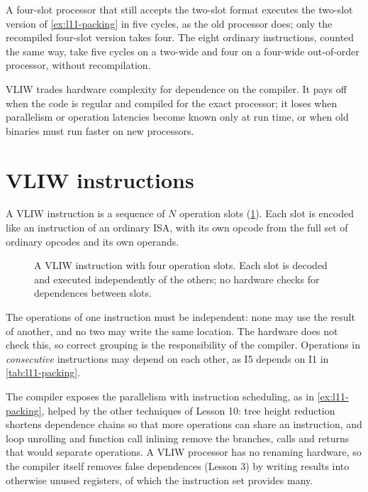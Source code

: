 \documentclass[../main.tex]{subfiles}
\begin{document}
\begin{example}
  \label{ex:l11-compat}
  A four-slot processor that still accepts the two-slot format executes the
  two-slot version of \cref{ex:l11-packing} in five cycles, as the old
  processor does; only the recompiled four-slot version takes four.  The eight
  ordinary instructions, counted the same way, take five cycles on a two-wide
  and four on a four-wide out-of-order processor, without recompilation.
\end{example}

\begin{keypoint}
  VLIW trades hardware complexity for dependence on the compiler.  It pays off
  when the code is regular and compiled for the exact processor; it loses when
  parallelism or operation latencies become known only at run time, or when
  old binaries must run faster on new processors.
\end{keypoint}

\section{VLIW instructions}
\label{sec:l11-instructions}

A VLIW instruction is a sequence of $N$ operation slots
(\cref{fig:l11-format}).  Each
slot is encoded like an instruction of an ordinary ISA, with its own opcode
from the full set of ordinary opcodes and its own operands.

\begin{figure}[htbp]
  \centering
  
  \caption{A VLIW instruction with four operation slots.  Each slot is decoded
    and executed independently of the others; no hardware checks for
    dependences between slots.}
  \label{fig:l11-format}
\end{figure}

The operations of one instruction must be independent: none may use the
result of another, and no two may write the same location.  The hardware does
not check this, so correct grouping is the responsibility of the compiler.
Operations in \emph{consecutive} instructions may depend on each other, as I5
depends on I1 in \cref{tab:l11-packing}.

The compiler exposes the parallelism with instruction scheduling, as in
\cref{ex:l11-packing}, helped by the other techniques of Lesson 10: tree
height reduction shortens dependence chains so
that more operations can share an instruction, and loop unrolling and function
call inlining remove the branches, calls and
returns that would separate operations.  A VLIW processor has no renaming
hardware, so the compiler itself removes false dependences (Lesson 3) by
writing results into otherwise unused registers, of which the instruction set
provides many.
\end{document}
